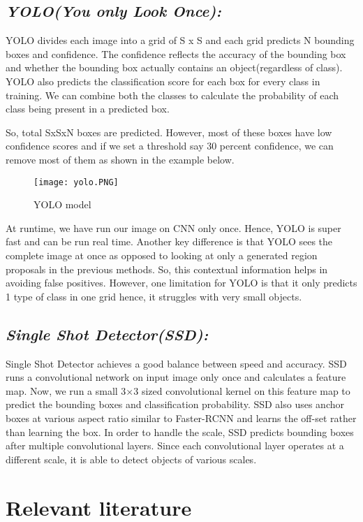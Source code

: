 	
	\subsection{\emph{YOLO(You only Look Once):}}
		 YOLO divides each image into a grid of S x S and each grid predicts N bounding boxes and confidence. The confidence reflects the accuracy of the bounding box and whether the bounding box actually contains an object(regardless of class). YOLO also predicts the classification score for each box for every class in training. We can combine both the classes to calculate the probability of each class being present in a predicted box.~\cite{objdet}
		 
		 So, total SxSxN boxes are predicted. However, most of these boxes have low confidence scores and if we set a threshold say 30 percent confidence, we can remove most of them as shown in the example below.
		 \begin{figure}[htbp]
		 	\centering
		 	\texttt{[image: yolo.PNG]}
		 	\caption{YOLO model\label{YOLO model}}
		 \end{figure}
		 
		 At runtime, we have run our image on CNN only once. Hence, YOLO is super fast and can be run real time. Another key difference is that YOLO sees the complete image at once as opposed to looking at only a generated region proposals in the previous methods. So, this contextual information helps in avoiding false positives. However, one limitation for YOLO is that it only predicts 1 type of class in one grid hence, it struggles with very small objects. 
		  
	\subsection{\emph{Single Shot Detector(SSD):}}
		Single Shot Detector achieves a good balance between speed and accuracy. SSD runs a convolutional network on input image only once and calculates a feature map. Now, we run a small 3×3 sized convolutional kernel on this feature map to predict the bounding boxes and classification probability. SSD also uses anchor boxes at various aspect ratio similar to Faster-RCNN and learns the off-set rather than learning the box. In order to handle the scale, SSD predicts bounding boxes after multiple convolutional layers. Since each convolutional layer operates at a different scale, it is able to detect objects of various scales. ~\cite{objdet}
	
	\section{Relevant literature}
	\label{sec:Relevant Literature}
	
